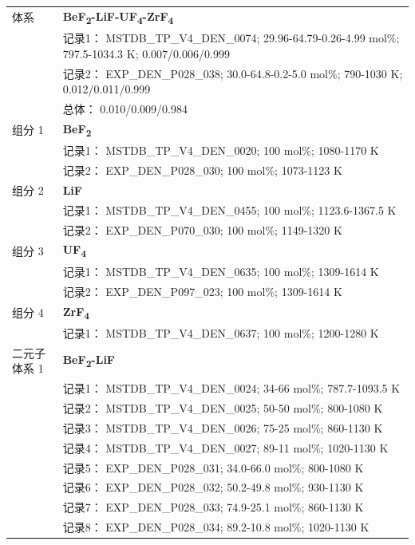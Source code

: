 \documentclass[12pt]{article}
\begin{document}
{\begin{longtable}[]{@{}
  >{\raggedright\arraybackslash}p{}
  >{\raggedright\arraybackslash}p{}@{}}
\midrule
体系 & \textbf{BeF\textsubscript{2}-LiF-UF\textsubscript{4}-ZrF\textsubscript{4}} \\
 & 记录1： MSTDB\_TP\_V4\_DEN\_0074; 29.96-64.79-0.26-4.99 mol\%; 797.5-1034.3 K; 0.007/0.006/0.999 \\
 & 记录2： EXP\_DEN\_P028\_038; 30.0-64.8-0.2-5.0 mol\%; 790-1030 K; 0.012/0.011/0.999 \\
 & 总体： 0.010/0.009/0.984  \\

组分 1  & \textbf{BeF\textsubscript{2}} \\
 & 记录1： MSTDB\_TP\_V4\_DEN\_0020; 100 mol\%; 1080-1170 K \\
 & 记录2： EXP\_DEN\_P028\_030; 100 mol\%; 1073-1123 K  \\

组分 2  & \textbf{LiF} \\
 & 记录1： MSTDB\_TP\_V4\_DEN\_0455; 100 mol\%; 1123.6-1367.5 K \\
 & 记录2： EXP\_DEN\_P070\_030; 100 mol\%; 1149-1320 K  \\

组分 3  & \textbf{UF\textsubscript{4}} \\
 & 记录1： MSTDB\_TP\_V4\_DEN\_0635; 100 mol\%; 1309-1614 K \\
 & 记录2： EXP\_DEN\_P097\_023; 100 mol\%; 1309-1614 K  \\

组分 4  & \textbf{ZrF\textsubscript{4}} \\
 & 记录1： MSTDB\_TP\_V4\_DEN\_0637; 100 mol\%; 1200-1280 K  \\

二元子体系 1  & \textbf{BeF\textsubscript{2}-LiF} \\
 & 记录1： MSTDB\_TP\_V4\_DEN\_0024; 34-66 mol\%; 787.7-1093.5 K \\
 & 记录2： MSTDB\_TP\_V4\_DEN\_0025; 50-50 mol\%; 800-1080 K \\
 & 记录3： MSTDB\_TP\_V4\_DEN\_0026; 75-25 mol\%; 860-1130 K \\
 & 记录4： MSTDB\_TP\_V4\_DEN\_0027; 89-11 mol\%; 1020-1130 K \\
 & 记录5： EXP\_DEN\_P028\_031; 34.0-66.0 mol\%; 800-1080 K \\
 & 记录6： EXP\_DEN\_P028\_032; 50.2-49.8 mol\%; 930-1130 K \\
 & 记录7： EXP\_DEN\_P028\_033; 74.9-25.1 mol\%; 860-1130 K \\
 & 记录8： EXP\_DEN\_P028\_034; 89.2-10.8 mol\%; 1020-1130 K  \\


\end{longtable}}
\end{document}
